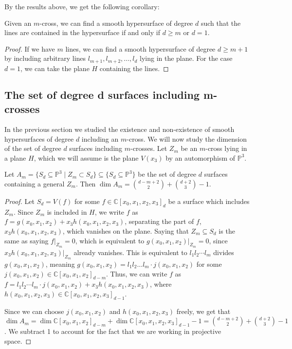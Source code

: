 By the results above, we get the following corollary:
\begin{corollary}
Given an $m$-cross, we can find a smooth hypersurface of degree $d$ such that the lines are contained in the hypersurface if and only if $d \geq m$ or $d=1$.
\end{corollary}
\begin{proof}
    If we have $m$ lines, we can find a smooth hypersurface of degree $d \geq m+1$ by including arbitrary lines $l_{m+1}, l_{m+2}, \dots, l_d$ lying in the plane. For the case $d=1$, we can take the plane $H$ containing the lines.
\end{proof}

\subsection{The set of degree d surfaces including m-crosses}

In the previous section we studied the existence and non-existence of smooth hypersurfaces of degree $d$ including an $m$-cross. We will now study the dimension of the set of degree $d$ surfaces including $m$-crosses. Let $Z_m$ be an $m$-cross lying in a plane $H$, which we will assume is the plane $V(x_3)$ by an automorphism of $\mathbb{P}^3$.

\begin{proposition}
    Let $A_m = \{S_d \subseteq \mathbb{P}^3 \mid Z_m \subset S_d\} \subseteq \{S_d \subseteq \mathbb{P}^3\}$ be the set of degree $d$ surfaces containing a general $Z_m$. Then $\dim{A_m} = \binom{d-m+2}{2} + \binom{d+2}{3} - 1$.
\end{proposition}

\begin{proof}
    Let $S_d = V(f)$ for some $f \in \mathbb{C}[x_0, x_1, x_2, x_3]_d$ be a surface which includes $Z_m$. Since $Z_m$ is included in 
    $H$, we write $f$ as $f = g(x_0,x_1,x_2) + x_3h(x_0,x_1,x_2,x_3)$, separating the part of $f$, $x_3h(x_0,x_1,x_2,x_3)$, which vanishes on the plane. Saying that $Z_m \subseteq S_d$ is the same as saying $f|_{Z_m} = 0$, which is equivalent to $g(x_0,x_1,x_2)|_{Z_m} = 0$, since $x_3h(x_0,x_1,x_2,x_3)|_{Z_m}$ already vanishes. This is equivalent to $l_1l_2 \cdots l_m$ divides $g(x_0,x_1,x_2)$, meaning $g(x_0,x_1,x_2) = l_1l_2 \dots l_m \cdot j(x_0,x_1,x_2)$ for some $j(x_0,x_1,x_2) \in \mathbb{C}[x_0,x_1,x_2]_{d-m}$. Thus, we can write $f$ as $f = l_1l_2 \cdots l_m \cdot j(x_0,x_1,x_2) + x_3h(x_0,x_1,x_2,x_3)$, where $h(x_0,x_1,x_2,x_3) \in \mathbb{C}[x_0,x_1,x_2,x_3]_{d-1}$.

    Since we can choose $j(x_0,x_1,x_2)$ and $h(x_0,x_1,x_2,x_3)$ freely, we get that $\dim{A_m} = \dim \mathbb{C}[x_0,x_1,x_2]_{d-m} + \dim \mathbb{C}[x_0,x_1,x_2,x_3]_{d-1} - 1 = \binom{d-m+2}{2} + \binom{d+2}{3} - 1$. We subtract 1 to account for the fact that we are working in projective space.
\end{proof}


